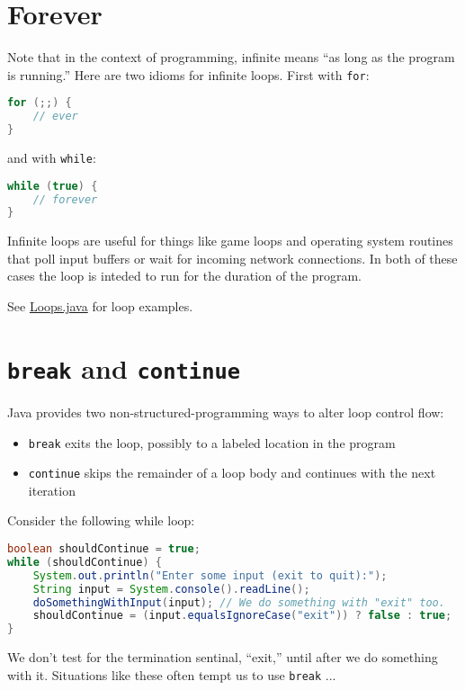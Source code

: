 \documentclass{article}
\begin{document}
\section{Forever}

Note that in the context of programming, infinite means ``as long as the program is running.''
Here are two idioms for infinite loops.  First with {\tt for}:
\begin{lstlisting}[language=Java]
for (;;) {
    // ever
}
\end{lstlisting}

and with {\tt while}:
\begin{lstlisting}[language=Java]
while (true) {
    // forever
}
\end{lstlisting}

Infinite loops are useful for things like game loops and operating system routines that poll input buffers or wait for incoming network connections.  In both of these cases the loop is inteded to run for the duration of the program.

See \href{\code/Loops.java}{Loops.java} for loop examples.



\section{{\tt break} and {\tt continue}}


Java provides two non-structured-programming ways to alter loop control flow:
\begin{itemize}
\item {\tt break} exits the loop, possibly to a labeled location in the program
\item {\tt continue} skips the remainder of a loop body and continues with the next iteration
\end{itemize}

Consider the following while loop:
\begin{lstlisting}[language=Java]
boolean shouldContinue = true;
while (shouldContinue) {
    System.out.println("Enter some input (exit to quit):");
    String input = System.console().readLine();
    doSomethingWithInput(input); // We do something with "exit" too.
    shouldContinue = (input.equalsIgnoreCase("exit")) ? false : true;
}
\end{lstlisting}
We don't test for the termination sentinal, ``exit,'' until after we do something with it.  Situations like these often tempt us to use {\tt break} ...
\end{document}
